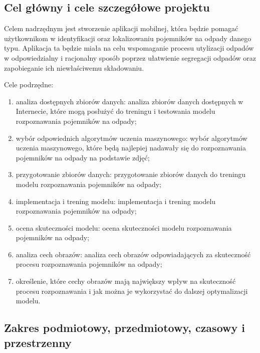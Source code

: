\documentclass[12pt,twoside]{book}
\begin{document}
\subsection{Cel główny i cele szczegółowe projektu}

Celem nadrzędnym jest stworzenie aplikacji mobilnej, która będzie pomagać użytkownikom w identyfikacji oraz lokalizowaniu pojemników na odpady danego typu. Aplikacja ta będzie miała na celu wspomaganie procesu utylizacji odpadów w odpowiedzialny i racjonalny sposób poprzez ułatwienie segregacji odpadów oraz zapobieganie ich niewłaściwemu składowaniu.

Cele podrzędne:
\begin{enumerate}[label=--]
    \item analiza dostępnych zbiorów danych: analiza zbiorów danych dostępnych w Internecie, które mogą posłużyć do treningu i testowania modelu rozpoznawania pojemników na odpady;
    \item wybór odpowiednich algorytmów uczenia maszynowego: wybór algorytmów uczenia maszynowego, które będą najlepiej nadawały się do rozpoznawania pojemników na odpady na podstawie zdjęć;
    \item przygotowanie zbiorów danych: przygotowanie zbiorów danych do treningu modelu rozpoznawania pojemników na odpady;
    \item implementacja i trening modelu: implementacja i trening modelu rozpoznawania pojemników na odpady;
    \item ocena skuteczności modelu: ocena skuteczności modelu rozpoznawania pojemników na odpady;
    \item analiza cech obrazów: analiza cech obrazów odpowiadających za skuteczność procesu rozpoznawania pojemników na odpady;
    \item określenie, które cechy obrazów mają największy wpływ na skuteczność procesu rozpoznawania i jak można je wykorzystać do dalszej optymalizacji modelu.
\end{enumerate}


\subsection{Zakres podmiotowy, przedmiotowy, czasowy i przestrzenny}
\end{document}
